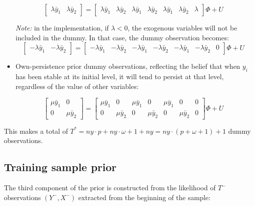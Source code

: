 \documentclass[10pt,a4paper]{article}
\begin{document}
\begin{itemize}
$$\left[
\begin{array}{cc}
\lambda\bar{y}_1 & \lambda\bar{y}_2
\end{array}
\right]
=
\left[
\begin{array}{ccccccc}
\lambda\bar{y}_1 & \lambda\bar{y}_2 & \lambda\bar{y}_1 & \lambda\bar{y}_2 & \lambda\bar{y}_1 & \lambda\bar{y}_2 & \lambda
\end{array}
\right]\Phi + U$$

\textit{Note:} in the implementation, if $\lambda < 0$, the exogenous variables will not be included in the dummy. In that case, the dummy observation becomes:
$$\left[
\begin{array}{cc}
-\lambda\bar{y}_1 & -\lambda\bar{y}_2
\end{array}
\right]
=
\left[
\begin{array}{ccccccc}
-\lambda\bar{y}_1 & -\lambda\bar{y}_2 & -\lambda\bar{y}_1 & -\lambda\bar{y}_2 & -\lambda\bar{y}_1 & -\lambda\bar{y}_2 & 0
\end{array}
\right]\Phi + U$$

\item Own-persistence prior dummy observations, reflecting the belief that when $y_i$ has been
stable at its initial level, it will tend to persist at that level, regardless of the value of
other variables:

$$\left[
\begin{array}{cc}
\mu\bar{y}_1 & 0 \\
0 & \mu\bar{y}_2
\end{array}
\right]
=
\left[
\begin{array}{ccccccc}
\mu\bar{y}_1 & 0 & \mu\bar{y}_1 &0 & \mu\bar{y}_1 & 0 & 0 \\
0 & \mu\bar{y}_2 & 0 & \mu\bar{y}_2 & 0 &\mu\bar{y}_2 & 0
\end{array}
\right]\Phi + U$$


\end{itemize}

This makes a total of $T^* = ny\cdot p + ny\cdot\omega + 1 + ny = ny\cdot(p+\omega+1)+1$ dummy observations.

\subsection{Training sample prior}

The third component of the prior is constructed from the likelihood of $T^-$ observations $(Y^-,X^-)$ extracted from the beginning of the sample:
\end{document}
